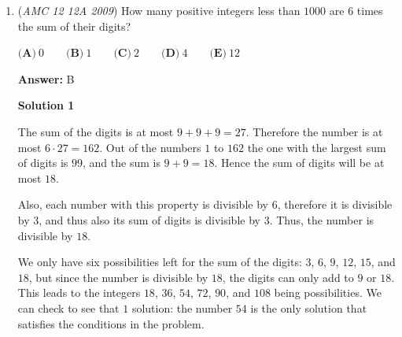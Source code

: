 \begin{enumerate}
The sequence $\{ d_n\}$ goes $1, 5, 13, 25, 41,\dots$. The first finite differences go $4, 8, 12, 16, \dots$. The second finite differences go $4, 4, 4, \dots$, so we see that the second finite difference is constant. Thus, $d_n$ can be represented as a quadratic, $d_n = an^2 + bn + c$. However, we already know $d_1 = 1$, $d_2 = 3$, and $d_3 = 13$. Thus,
 \[a + b + c = d_1 = 1\]
 \[4a + 2b + c = d_2 = 3\]
 \[9a + 3b + c = d_3 = 13\]Solving this system for $a$, $b$, and $c$ gives $a = 2$, $b = -2$, $c = 1$. Finally, $d_n = 2n^2 - 2n + 1\implies d_{20} = \boxed{(E)761}$




\textbf{Solution 5}

We can use Newton's little formula for this problem. We continue with solution 4 until we get the second finite differences go $4, 4, 4, \dots$, Then we find the 20th term by applying the formula to get  1 (20-1 c 0) + 4 (20 - 1 c 1) + 4(20-1 c 2) = 1 (19 c 0 ) + 4 (19 c 1) + 4(19 c 2) = 761

 \begin{verbatim}
- timi821
\end{verbatim}




	\item (\textit{AMC 12 12A 2009}) How many positive integers less than $1000$ are $6$ times the sum of their digits?


 $\textbf{(A)}\ 0 \qquad \textbf{(B)}\ 1 \qquad \textbf{(C)}\ 2 \qquad \textbf{(D)}\ 4 \qquad \textbf{(E)}\ 12$

 \textbf{Answer: }B



\textbf{Solution 1}

The sum of the digits is at most $9+9+9=27$. Therefore the number is at most $6\cdot 27 = 162$. Out of the numbers $1$ to $162$ the one with the largest sum of digits is $99$, and the sum is $9+9=18$. Hence the sum of digits will be at most $18$.

 Also, each number with this property is divisible by $6$, therefore it is divisible by $3$, and thus also its sum of digits is divisible by $3$. Thus, the number is divisible by $18$.

 We only have six possibilities left for the sum of the digits: $3$, $6$, $9$, $12$, $15$, and $18$, but since the number is divisible by $18$, the digits can only add to $9$ or $18$. This leads to the integers $18$, $36$, $54$, $72$, $90$, and $108$ being possibilities. We can check to see that $\boxed{1}$ solution: the number $54$ is the only solution that satisfies the conditions in the problem.


\end{enumerate}
